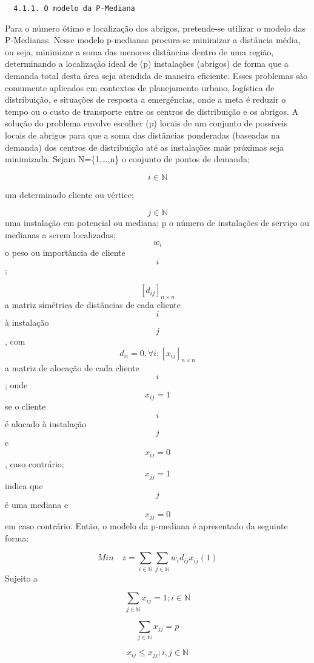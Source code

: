 \documentclass[
]{article}
\begin{document}
\begin{verbatim}
  4.1.1. O modelo da P-Mediana
\end{verbatim}

Para o número ótimo e localização dos abrigos, pretende-se utilizar o
modelo das P-Medianas. Nesse modelo p-medianas procura-se minimizar a
distância média, ou seja, minimizar a soma das menores distâncias dentro
de uma região, determinando a localização ideal de (p) instalações
(abrigos) de forma que a demanda total desta área seja atendida de
maneira eficiente. Esses problemas são comumente aplicados em contextos
de planejamento urbano, logística de distribuição, e situações de
resposta a emergências, onde a meta é reduzir o tempo ou o custo de
transporte entre os centros de distribuição e os abrigos. A solução do
problema envolve escolher (p) locais de um conjunto de possíveis locais
de abrigos para que a soma das distâncias ponderadas (baseadas na
demanda) dos centros de distribuição até as instalações mais próximas
seja minimizada. Sejam N=\{1,\ldots,n\} o conjunto de pontos de demanda;

\[
i \in \mathbb{N}
\]

um determinado cliente ou vértice;

\[
j \in \mathbb{N}
\] uma instalação em potencial ou mediana; p o número de instalações de
serviço ou medianas a serem localizadas; \[
w_i
\] o peso ou importância de cliente \[
i
\];

\[
[d_{ij}]_{n \times n}
\] a matriz simétrica de distâncias de cada cliente \[i\] à instalação
\[
j
\] , com \[
d_{ii}=0, \forall i; [x_{ij}]_{n \times n} 
\] a matriz de alocação de cada cliente \[i\]; onde \[
x_{ij}=1
\] se o cliente \[
i
\] é alocado à instalação \[
j
\] e \[
x_{ij}=0
\] , caso contrário; \[
x_{jj}=1
\] indica que \[
j
\] é uma mediana e \[
x_{jj}=0
\] em caso contrário. Então, o modelo da p-mediana é apresentado da
seguinte forma:

\[
Min \quad  z=\sum_{i \in \mathbb{N}} \sum_{j \in \mathbb{N}} w_{i}d_{ij}x_{ij}    (1)
\] Sujeito a

\[
\sum_{j \in \mathbb{N}}x_{ij}=1; i \in \mathbb{N}
\]

\[
\sum_{j \in \mathbb{N}}x_{jj}=p
\]

\[
x_{ij} \leq x_{jj}; i,j \in \mathbb{N}
\]
\end{document}
